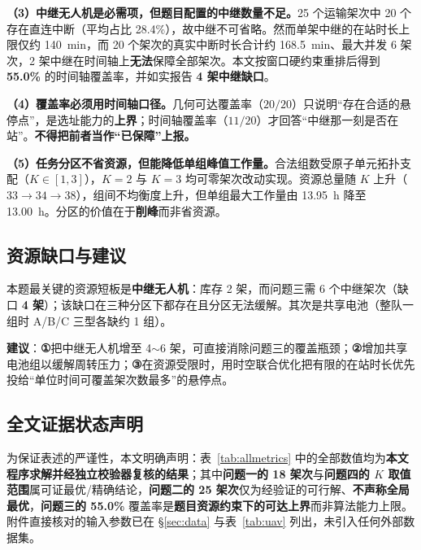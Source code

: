 \textbf{（3）中继无人机是必需项，但题目配置的中继数量不足。}25 个运输架次中 20 个存在直连中断（平均占比 28.4\%），故中继不可省略。然而单架中继的在站时长上限仅约 \SI{140}{min}，而 20 个架次的真实中断时长合计约 \SI{168.5}{min}、最大并发 6 架次，2 架中继在时间轴上\textbf{无法}保障全部架次。本文按窗口硬约束重排后得到 \textbf{55.0\%} 的时间轴覆盖率，并如实报告 \textbf{4 架中继缺口}。

\textbf{（4）覆盖率必须用时间轴口径。}几何可达覆盖率（$20/20$）只说明“存在合适的悬停点”，是选址能力的\textbf{上界}；时间轴覆盖率（$11/20$）才回答“中继那一刻是否在站”。\textbf{不得把前者当作“已保障”上报。}

\textbf{（5）任务分区不省资源，但能降低单组峰值工作量。}合法组数受原子单元拓扑支配（$K\in[1,3]$），$K=2$ 与 $K=3$ 均可零架次改动实现。资源总量随 $K$ 上升（$33\to34\to38$），组间不均衡度上升，但单组最大工作量由 \SI{13.95}{h} 降至 \SI{13.00}{h}。分区的价值在于\textbf{削峰}而非省资源。

\subsection{资源缺口与建议}

本题最关键的资源短板是\textbf{中继无人机}：库存 2 架，而问题三需 6 个中继架次（缺口 \textbf{4 架}）；该缺口在三种分区下都存在且分区无法缓解。其次是共享电池（整队一组时 A/B/C 三型各缺约 1 组）。

\textbf{建议}：\textbf{①}把中继无人机增至 4$\sim$6 架，可直接消除问题三的覆盖瓶颈；\textbf{②}增加共享电池组以缓解周转压力；\textbf{③}在资源受限时，用时空联合优化把有限的在站时长优先投给“单位时间可覆盖架次数最多”的悬停点。

\subsection{全文证据状态声明}

为保证表述的严谨性，本文明确声明：表~\ref{tab:allmetrics} 中的全部数值均为\textbf{本文程序求解并经独立校验器复核的结果}；其中\textbf{问题一的 18 架次}与\textbf{问题四的 $K$ 取值范围}属可证最优/精确结论，\textbf{问题二的 25 架次}仅为经验证的可行解、\textbf{不声称全局最优}，\textbf{问题三的 55.0\%} 覆盖率是\textbf{题目资源约束下的可达上界}而非算法能力上限。附件直接核对的输入参数已在 \S\ref{sec:data} 与表~\ref{tab:uav} 列出，未引入任何外部数据集。
